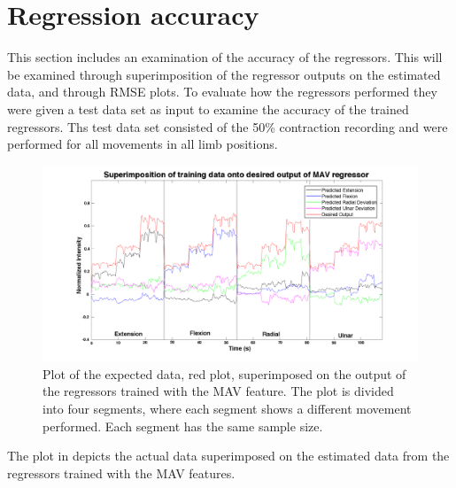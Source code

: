 \section{Regression accuracy}
This section includes an examination of the accuracy of the regressors. This will be examined through superimposition of the regressor outputs on the estimated data, and through RMSE plots. To evaluate how the regressors performed they were given a test data set as input to examine the accuracy of the trained regressors. Ths test data set consisted of the 50\% contraction recording and were performed for all movements in all limb positions. \\

\begin{figure}[H]
	\includegraphics[width=1\textwidth]{figures/results/NewSuperPositionTestDataMAV}  %
	\caption{Plot of the expected data, red plot, superimposed on the output of the regressors trained with the MAV feature. The plot is divided into four segments, where each segment shows a different movement performed. Each segment has the same sample size.}
	\label{fig:SuperPositionTestDataMAV}  %
\end{figure}
The plot in  depicts the actual data superimposed on the estimated data from the regressors trained with the MAV features. 

